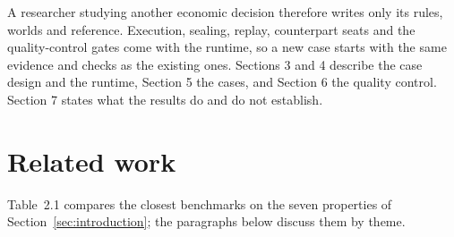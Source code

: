 A researcher studying another economic decision therefore writes only its
rules, worlds and reference. Execution, sealing, replay, counterpart seats
and the quality-control gates come with the runtime, so a new case starts
with the same evidence and checks as the existing ones.
Sections 3 and 4 describe the case design and the runtime, Section 5 the
cases, and Section 6 the quality control. Section 7 states what the results
do and do not establish.

\section{Related work}
\label{sec:related-work}

Table~2.1 compares the closest benchmarks on the seven properties of
Section~\ref{sec:introduction}; the paragraphs below discuss them by theme.

